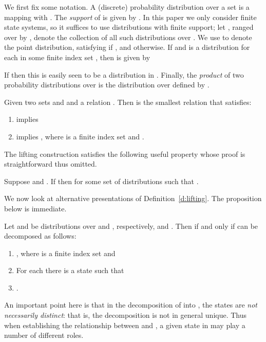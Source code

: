 \documentclass{article}
\def\squareforqed{\hbox{\rlap{}}}
\def\qed{\ifmmode\squareforqed\else{\unskip\nobreak\hfil
\penalty50\hskip1em\null\nobreak\hfil\squareforqed
\parfillskip=0pt\finalhyphendemerits=0\endgraf}\fi}
\begin{document}
We first fix some notation. A (discrete) probability
distribution over a set  is a
mapping \mbox{} with . The \emph{support} of  is
given by . In
this paper we only consider finite state systems, so it suffices to
use distributions with finite support; let , ranged over
by , denote the collection of all such distributions
over .  We use  to denote the point distribution,
satisfying  if , and  otherwise. If  and  is a distribution for each  in some finite
index set , then  is  given by

If  then this is easily seen to be a
distribution in .
Finally, the
\emph{product} of two probability distributions
 over  is the distribution 
over  defined by
.


\begin{definition}\label{d:lifting}
Given two sets  and  and a relation . Then  is the smallest relation that
satisfies:
\begin{enumerate}
\item
 implies 

\item
 implies ,
where  is a finite index set and  .
\end{enumerate}
\end{definition}

The lifting construction satisfies the following  useful property
whose proof is straightforward thus omitted.
\begin{proposition}\rm\label{prop:lifting}
Suppose  and
 . If  then
  for some set of
distributions  such that .
\hfill\qed
\end{proposition}

We now look at alternative presentations of
Definition~\ref{d:lifting}. The proposition below is immediate.
\begin{proposition}\label{p:lifting}
Let  and  be distributions over  and ,
  respectively, and . Then
 if and only if  can be
decomposed as follows:
\begin{enumerate}
\item
, where
   is a finite index set and  

\item
For each  there is a state  such that 

\item
. \hfill\qed
\end{enumerate}
\end{proposition}

An important point here is that in the decomposition of 
into , the states  are
\emph{not necessarily distinct}: that is, the decomposition is not
in general unique. Thus when establishing the relationship between
 and , a given state  in  may play a
number of different roles.
\end{document}
